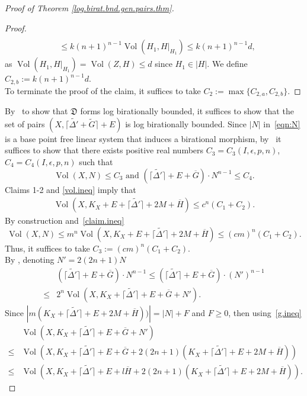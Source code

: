 \documentclass{amsart}[12pt,a4paper]
\theoremstyle{definition}
\DeclareMathOperator{\Vol}{\mathrm{Vol}}
\begin{document}
\begin{proof}[Proof of Theorem \ref{log.birat.bnd.gen.pairs.thm}]
\begin{proof}
\begin{align*}
\\
&\leq k (n+1)^{n-1} \Vol(H_1, H\vert_{H_1}) \leq k (n+1)^{n-1} d,
\end{align*}
\noindent
as $\Vol(H_1, H\vert_{H_1}) = \Vol(Z, H) \leq d$ since $H_1 \in |H|$.
We define $C_{2, b}:=k (n+1)^{n-1} d$.
\\
To terminate the proof of the claim, it suffices to take $C_2:= \max\{C_{2, a}, C_{2, b}\}$.
\end{proof}
\noindent
By~\cite[Lemma 2.4.2(3)]{HMX13} to show that $\mathfrak{D}$ forms log birationally bounded, it suffices to show that the set of pairs $(X, \lceil \widetilde{\Delta'} + \widetilde{G} \rceil+ E)$ is log birationally bounded.
Since $|N|$ in~\eqref{eqn:N} is a base point free linear system that induces a birational morphism, by~\cite[Lemma 2.4.2(4)]{HMX13} it suffices to show that there exists positive real numbers $C_3=C_3(I, \epsilon, p, n)$, $C_4=C_4(I, \epsilon, p, n)$ such that 
\[
\Vol(X, N) \leq C_3 \textrm{ and } (\lceil \widetilde{\Delta'}\rceil+ E+\overline G) \cdot N^{n-1} \leq C_4.
\]
Claims 1-2 and \eqref{vol.ineq} imply that 
\begin{align}
\label{claim.ineq}
\Vol(X, K_X+E +\lceil \widetilde{\Delta'} \rceil+ 2M + \overline{H}) \leq c^n(C_1+C_2).
\end{align}
\noindent
By construction and~\eqref{claim.ineq}
\[
\Vol(X, N) \leq m^n\Vol(X, K_X+E +\lceil \widetilde{\Delta'} \rceil+ 2M + \overline{H}) \leq (cm)^n (C_1+C_2).
\]
\noindent
Thus, it suffices to take $C_3:=(cm)^n (C_1+C_2)$.\\
By \cite[Lemma 3.2]{HMX13}, denoting $N'=2(2n+1)N$
\begin{align}
\label{hmx13.ineq1}
&(\lceil \widetilde{\Delta'}\rceil+ E + \overline G) \cdot N^{n-1} \leq 
(\lceil \widetilde{\Delta'}\rceil+ E+\overline G) \cdot (N')^{n-1}\\
\nonumber 
 \leq &  2^n \Vol(X, K_X+\lceil \widetilde{\Delta'}\rceil+ E+\overline G+ N'). 
\end{align}
Since $|m(K_X+\lceil \widetilde{\Delta'}\rceil+ E+ 2M + \overline{H}))|  = |N| + F$ and $F \geq 0$, then using~\eqref{g.ineq}
\begin{align}
\label{hmx13.ineq2}
&\Vol(X, K_X+\lceil \widetilde{\Delta'}\rceil+ E+ \overline G+ N') 
\\
\nonumber
\leq &\Vol(X, K_X+\lceil \widetilde{\Delta'}\rceil+ E+ \overline G+ 2(2n+1) (K_X+\lceil \widetilde{\Delta'}\rceil+ E+ 2M + \overline{H}))\\
\nonumber
\leq &\Vol(X, K_X+\lceil \widetilde{\Delta'}\rceil+ E+ l\overline{H}+ 2(2n+1) (K_X+\lceil \widetilde{\Delta'}\rceil+ E+ 2M + \overline{H})).

\end{align}
\end{proof}
\end{document}
